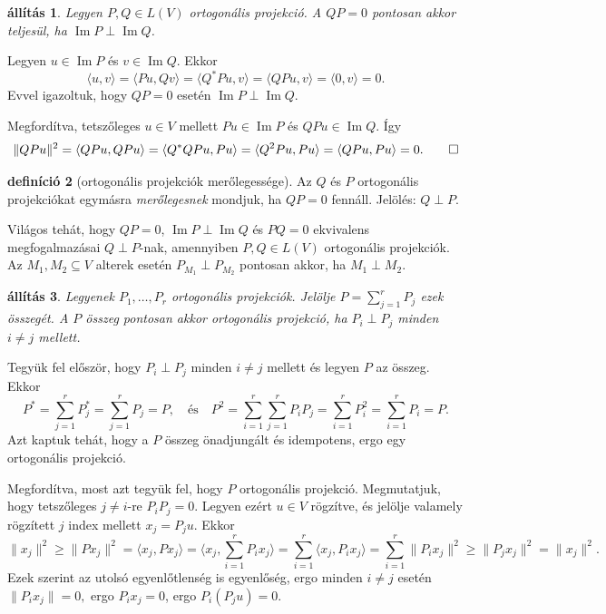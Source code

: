 \documentclass[a4paper, showtrims]{memoir}
\makeatletter
\renewenvironment{proof}[1][\proofname]
    {\par\pushQED{\qed}%
    \normalfont \topsep6\p@\@plus6\p@\relax
    \trivlist
    \item[\hskip\labelsep
        \itshape
    #1\@addpunct{:}]\ignorespaces}
    {\popQED\endtrivlist\@endpefalse}
\theoremstyle{plain}
\newtheorem{proposition}{állítás}[chapter]
\theoremstyle{remark}
\theoremstyle{definition}
\newtheorem{definition}[proposition]{definíció}
\DeclareMathOperator{\im}{Im}
\newcommand{\ip}[2]{\langle#1,#2\rangle}
\makeatother
\begin{document}
\begin{proposition}
	Legyen $P,Q\in L\left( V \right)$ ortogonális projekció.
	A $QP=0$ pontosan akkor teljesül, ha $\im P\perp\im Q$.
\end{proposition}
\begin{proof}
	Legyen $u\in \im P$ és $v\in \im Q$.
	Ekkor
	\[
		\ip{u}{v}
		=
		\ip{Pu}{Qv}
		=
		\ip{Q^\ast Pu}{v}
		=
		\ip{QPu}{v}
		=
		\ip{0}{v}
		=
		0.
	\]
	Evvel igazoltuk, hogy $QP=0$ esetén $\im P\perp\im Q$.

	Megfordítva, tetszőleges $u\in V$ mellett $Pu\in\im P$ és $QPu\in\im Q$.
	Így
	\[
		\|QPu\|^2
		=
		\ip{QPu}{QPu}
		=
		\ip{Q^\ast QPu}{Pu}
		=
		\ip{Q^2Pu}{Pu}
		=
		\ip{QPu}{Pu}
		=
		0.
		\qedhere
	\]
\end{proof}
\begin{definition}[ortogonális projekciók merőlegessége]
	Az $Q$ és $P$ ortogonális projekciókat egymásra \emph{merőlegesnek} mondjuk, ha $QP=0$ fennáll.
	Jelölés: $Q\perp P$.
\end{definition}
Világos tehát, hogy $QP=0$, $\im P\perp \im Q$ és $PQ=0$ ekvivalens megfogalmazásai $Q\perp P$-nak,
amennyiben $P,Q\in L\left( V \right)$ ortogonális projekciók.
Az $M_1, M_2\subseteq V$ alterek esetén $P_{M_1}\perp P_{M_2}$ pontosan akkor, ha $M_1\perp M_2$.
\begin{proposition}
	Legyenek $P_1,\ldots,P_r$ ortogonális projekciók.
	Jelölje $P=\sum_{j=1}^rP_j$ ezek összegét.
	A $P$ összeg pontosan akkor ortogonális projekció, ha $P_i\perp P_j$ minden $i\neq j$ mellett.
\end{proposition}
\begin{proof}
    Tegyük fel először, hogy $P_i\perp P_j$ minden $i\neq j$ mellett és legyen $P$ az összeg.
    Ekkor
    \[
        P^\ast
        =
        \sum_{j=1}^rP_j^\ast
        =
        \sum_{j=1}^rP_j
        =
        P,
        \quad\text{és}\quad
        P^2
        =
        \sum_{i=1}^r\sum_{j=1}^rP_iP_j
        =
        \sum_{i=1}^rP_i^2
        =
        \sum_{i=1}^rP_i
        =
        P.
    \]
    Azt kaptuk tehát, hogy a $P$ összeg önadjungált és idempotens,
    ergo egy ortogonális projekció.

    Megfordítva, most azt tegyük fel, hogy $P$ ortogonális projekció.
    Megmutatjuk, hogy tetszőleges $j\neq i$-re
    $P_iP_j=0$.
    Legyen ezért $u\in V$ rögzítve, és jelölje valamely rögzített $j$ index mellett $x_j=P_ju$.
    Ekkor
    \[
        \|x_j\|^2
        \geq
        \|Px_j\|^2
        =
        \ip{x_j}{Px_j}
        =
        \ip{x_j}{\sum_{i=1}^rP_ix_j}
        =
        \sum_{i=1}^r\ip{x_j}{P_ix_j}
        =
        \sum_{i=1}^r\|P_ix_j\|^2
        \geq
        \|P_jx_j\|^2
        =
        \|x_j\|^2.
    \]
    Ezek szerint az utolsó egyenlőtlenség is egyenlőség, 
    ergo minden $i\neq j$ esetén
    \(
    \|P_ix_j\|=0,
    \)
    ergo
    \(P_ix_j=0\),
    ergo
    $P_i\left( P_ju \right)=0.$
\end{proof}
\end{document}
